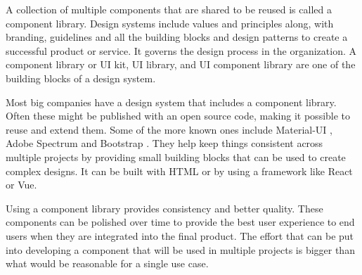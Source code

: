 \documentclass{master_thesis}
\begin{document}
A collection of multiple components that are shared to be reused is called a component library. Design systems include values and principles along, with branding, guidelines and all the building blocks and design patterns to create a successful product or service. It governs the design process in the organization. A component library or UI kit, UI library, and UI component library are one of the building blocks of a design system. \citep{Ramotion2022}

Most big companies have a design system that includes a component library. Often these might be published with an open source code, making it possible to reuse and extend them. Some of the more known ones include Material-UI \citep{MUS}, Adobe Spectrum \citep{Adobe} and Bootstrap \citep{Collings}. They help keep things consistent across multiple projects by providing small building blocks that can be used to create complex designs.  It can be built with HTML or by using a framework like React or Vue.

Using a component library provides consistency and better quality. These components can be polished over time to provide the best user experience to end users when they are integrated into the final product. The effort that can be put into developing a component that will be used in multiple projects is bigger than what would be reasonable for a single use case.
\end{document}

